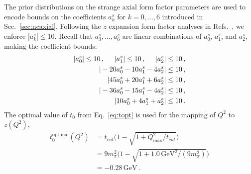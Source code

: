     The prior distributions on the strange axial form factor parameters are
    used to encode bounds on the coefficients $a_k^s$ for $k=0,\ldots,6$
    introduced in Sec.~\ref{sec:ncaxial}. Following the $z$ expansion form
    factor analyses in Refs.~\cite{Hill:2010yb,Bhattacharya:2011ah}, we enforce
    $|a_k^s| \le 10$. Recall that $a_3^s,\ldots,a_6^s$ are linear combinations
    of $a_0^s$, $a_1^s$, and $a_2^s$, making the coefficient bounds:
    \begin{align}\label{eq:axprior}
      |a_0^s| \le 10 \,, \hspace{5mm}
      |a_1^s| \le 10 \,, \hspace{5mm}
      |a_2^s| &\le 10 \,, \\
      |-20 a_0^s - 10a_1^s - 4a_2^s| &\le 10 \,, \\
      | 45 a_0^s + 20a_1^s + 6a_2^s| &\le 10 \,, \\
      |-36 a_0^s - 15a_1^s - 4a_2^s| &\le 10 \,, \\
      | 10 a_0^s + 4a_1^s + a_2^s| &\le 10 \,.
    \end{align}
    The optimal value of $t_0$ from Eq.~\ref{eq:topt} is used for the mapping
    of $Q^2$ to $z(Q^2)$,
    \begin{equation}
      \begin{aligned}
        t_0^{\textrm{optimal}}(Q^2) &= t_{cut}\Big(1 - \sqrt{1+Q^2_{\textrm{max}}/t_{cut}}\Big) \\
                                    &= 9m_{\pi}^2 \Big(1-\sqrt{1+1.0\,\textrm{GeV}^2/(9m_{\pi}^2)}\Big) \\
                                    &= -0.28\, \textrm{GeV}\,.
      \end{aligned}
    \end{equation}
    
